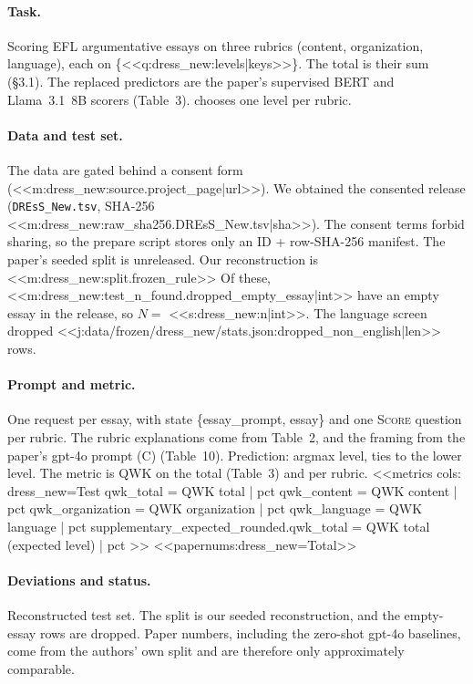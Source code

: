 \paragraph{Task.} Scoring EFL argumentative essays on three rubrics (content, organization, language), each on
\{<<q:dress_new:levels|keys>>\}. The total is their sum (\S3.1). The replaced predictors are the paper's
supervised BERT and Llama~3.1~8B scorers (Table~3). \jev{} chooses one level per rubric.

\paragraph{Data and test set.} The data are gated behind a consent form (<<m:dress_new:source.project_page|url>>).
We obtained the consented release (\texttt{DREsS\_New.tsv}, SHA-256
<<m:dress_new:raw_sha256.DREsS_New.tsv|sha>>). The consent terms forbid sharing, so the prepare script stores only an ID + row-SHA-256
manifest. The paper's seeded split is unreleased. Our reconstruction is <<m:dress_new:split.frozen_rule>> Of these, <<m:dress_new:test_n_found.dropped_empty_essay|int>>
have an empty essay in the release, so $N=$ <<s:dress_new:n|int>>. The language screen dropped
<<j:data/frozen/dress_new/stats.json:dropped_non_english|len>> rows.

\paragraph{Prompt and metric.} One request per essay, with state \{essay\_prompt, essay\} and one
\textsc{Score} question per rubric. The rubric explanations come from Table~2, and the framing from the paper's
gpt-4o prompt (C) (Table~10). Prediction: argmax level, ties to the lower level. The metric is QWK on the total
(Table~3) and per rubric.
<<metrics
cols: dress_new=Test
qwk_total = QWK total | pct
qwk_content = QWK content | pct
qwk_organization = QWK organization | pct
qwk_language = QWK language | pct
supplementary_expected_rounded.qwk_total = QWK total (expected level) | pct
>>
<<papernums:dress_new=Total>>

\paragraph{Deviations and status.} Reconstructed test set. The split is our seeded reconstruction, and the
empty-essay rows are dropped. Paper numbers, including the zero-shot gpt-4o baselines, come from the authors'
own split and are therefore only approximately comparable.
